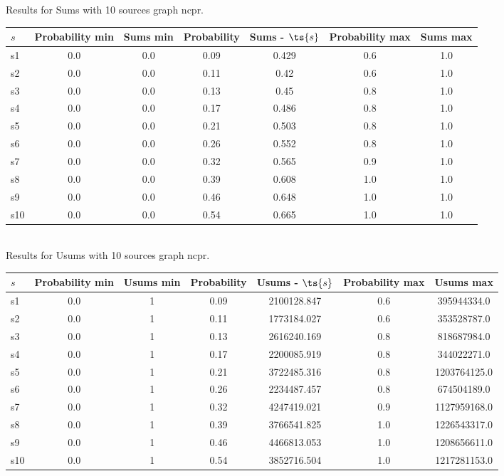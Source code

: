 \documentclass{article}
\begin{document}
\noindent Results for Sums with 10 sources graph ncpr.

\noindent\begin{tabular}{|l|c|c|c|c|c|c|}
\hline
$s$& Probability min & Sums min & Probability & Sums - $\ts{s}$ & Probability max & Sums max\\
\hline
s1 &0.0 & 0.0 & 0.09 & 0.429 & 0.6 & 1.0\\
\hline
s2 &0.0 & 0.0 & 0.11 & 0.42 & 0.6 & 1.0\\
\hline
s3 &0.0 & 0.0 & 0.13 & 0.45 & 0.8 & 1.0\\
\hline
s4 &0.0 & 0.0 & 0.17 & 0.486 & 0.8 & 1.0\\
\hline
s5 &0.0 & 0.0 & 0.21 & 0.503 & 0.8 & 1.0\\
\hline
s6 &0.0 & 0.0 & 0.26 & 0.552 & 0.8 & 1.0\\
\hline
s7 &0.0 & 0.0 & 0.32 & 0.565 & 0.9 & 1.0\\
\hline
s8 &0.0 & 0.0 & 0.39 & 0.608 & 1.0 & 1.0\\
\hline
s9 &0.0 & 0.0 & 0.46 & 0.648 & 1.0 & 1.0\\
\hline
s10 &0.0 & 0.0 & 0.54 & 0.665 & 1.0 & 1.0\\
\hline
\end{tabular}\\

\noindent Results for Usums with 10 sources graph ncpr.

\noindent\begin{tabular}{|l|c|c|c|c|c|c|}
\hline
$s$& Probability min & Usums min & Probability & Usums - $\ts{s}$ & Probability max & Usums max\\
\hline
s1 &0.0 & 1 & 0.09 & 2100128.847 & 0.6 & 395944334.0\\
\hline
s2 &0.0 & 1 & 0.11 & 1773184.027 & 0.6 & 353528787.0\\
\hline
s3 &0.0 & 1 & 0.13 & 2616240.169 & 0.8 & 818687984.0\\
\hline
s4 &0.0 & 1 & 0.17 & 2200085.919 & 0.8 & 344022271.0\\
\hline
s5 &0.0 & 1 & 0.21 & 3722485.316 & 0.8 & 1203764125.0\\
\hline
s6 &0.0 & 1 & 0.26 & 2234487.457 & 0.8 & 674504189.0\\
\hline
s7 &0.0 & 1 & 0.32 & 4247419.021 & 0.9 & 1127959168.0\\
\hline
s8 &0.0 & 1 & 0.39 & 3766541.825 & 1.0 & 1226543317.0\\
\hline
s9 &0.0 & 1 & 0.46 & 4466813.053 & 1.0 & 1208656611.0\\
\hline
s10 &0.0 & 1 & 0.54 & 3852716.504 & 1.0 & 1217281153.0\\
\hline
\end{tabular}\\
\end{document}
